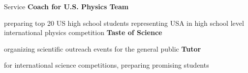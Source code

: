 \begin{rubric}{Service}
%
\entry*[\hspace{1.7cm} ]%
  \textbf{Coach for U.S. Physics Team}
  \par preparing top 20 US high school students representing USA in high school level international physics competition
%
\entry*[\hfill]%
  \textbf{Taste of Science} 
  \par organizing scientific outreach events
for the general public
%
\entry*[\hfill]%
  \textbf{Tutor}
  \par for international science competitions, preparing promising students
\end{rubric}

